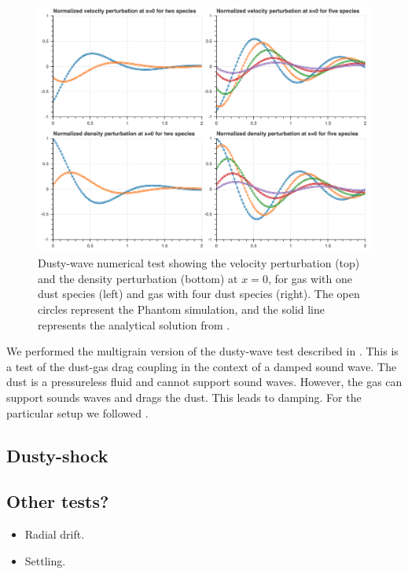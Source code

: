 \documentclass[fleqn,usenatbib]{mnras}
\begin{document}
\begin{figure}
   \begin{center}
      \includegraphics[width=\textwidth]{figs/dustywave.png}
      \caption{Dusty-wave numerical test showing the velocity perturbation (top)
         and the density perturbation (bottom) at \(x = 0\), for gas with one
         dust species (left) and gas with four dust species (right). The open
         circles represent the Phantom simulation, and the solid line represents
         the analytical solution from
         \citet{Benitez-Llambay2019ApJS..241...25B}.\label{fig:dustywave}}
   \end{center}
\end{figure}

We performed the multigrain version of the dusty-wave test described in
\citet{Laibe2011MNRAS.418.1491L}. This is a test of the dust-gas drag coupling
in the context of a damped sound wave. The dust is a pressureless fluid and
cannot support sound waves. However, the gas can support sounds waves and drags
the dust. This leads to damping. For the particular setup we followed
\citet{Benitez-Llambay2019ApJS..241...25B}.

\subsection{Dusty-shock}

\subsection{Other tests?}

\begin{itemize}
   \item Radial drift.
   \item Settling.
\end{itemize}
\end{document}
